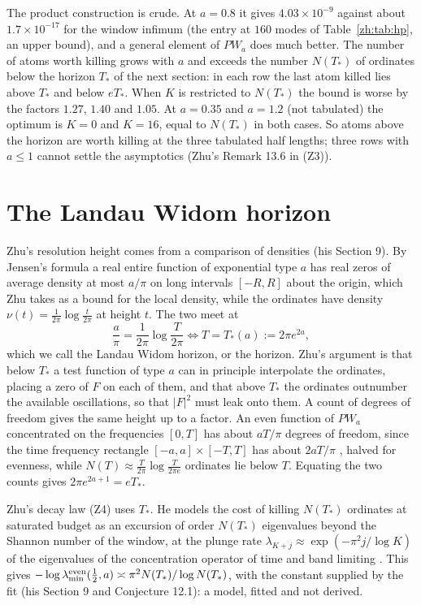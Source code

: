 The product construction is crude. At $a=0.8$ it gives $4.03\times10^{-9}$ against about $1.7\times10^{-17}$ for the window infimum (the entry at $160$ modes of Table~\ref{zh:tab:hp}, an upper bound), and a general element of $PW_a$ does much better. The number of atoms worth killing grows with $a$ and exceeds the number $N(T_*)$ of ordinates below the horizon $T_*$ of the next section: in each row the last atom killed lies above $T_*$ and below $eT_*$. When $K$ is restricted to $N(T_*)$ the bound is worse by the factors $1.27$, $1.40$ and $1.05$. At $a=0.35$ and $a=1.2$ (not tabulated) the optimum is $K=0$ and $K=16$, equal to $N(T_*)$ in both cases. So atoms above the horizon are worth killing at the three tabulated half lengths; three rows with $a\le1$ cannot settle the asymptotics (Zhu's Remark 13.6 in (Z3)).

\section{The Landau Widom horizon}\label{zh:sec:horizon}

Zhu's resolution height comes from a comparison of densities (his Section 9). By Jensen's formula a real entire function of exponential type $a$ has real zeros of average density at most $a/\pi$ on long intervals $[-R,R]$ about the origin, which Zhu takes as a bound for the local density, while the ordinates have density $\nu(t)=\frac1{2\pi}\log\frac t{2\pi}$ at height $t$. The two meet at
\begin{equation}\label{zh:horizon}
\frac a\pi=\frac1{2\pi}\log\frac T{2\pi}\iff T=T_*(a):=2\pi e^{2a},
\end{equation}
which we call the Landau Widom horizon, or the horizon. Zhu's argument is that below $T_*$ a test function of type $a$ can in principle interpolate the ordinates, placing a zero of $F$ on each of them, and that above $T_*$ the ordinates outnumber the available oscillations, so that $|F|^2$ must leak onto them. A count of degrees of freedom gives the same height up to a factor. An even function of $PW_a$ concentrated on the frequencies $[0,T]$ has about $aT/\pi$ degrees of freedom, since the time frequency rectangle $[-a,a]\times[-T,T]$ has about $2aT/\pi$ \cite{SlepianPollak61,LandauPollak62}, halved for evenness, while $N(T)\approx\frac T{2\pi}\log\frac T{2\pi e}$ ordinates lie below $T$. Equating the two counts gives $2\pi e^{2a+1}=eT_*$.

Zhu's decay law (Z4) uses $T_*$. He models the cost of killing $N(T_*)$ ordinates at saturated budget as an excursion of order $N(T_*)$ eigenvalues beyond the Shannon number of the window, at the plunge rate $\lambda_{K+j}\approx\exp(-\pi^2j/\log K)$ of the eigenvalues of the concentration operator of time and band limiting \cite{LandauWidom80}. This gives $-\log\lambda^{\rm even}_{\min}(\frac12,a)\asymp\pi^2N(T_*)/\log N(T_*)$, with the constant supplied by the fit (his Section 9 and Conjecture 12.1): a model, fitted and not derived.

